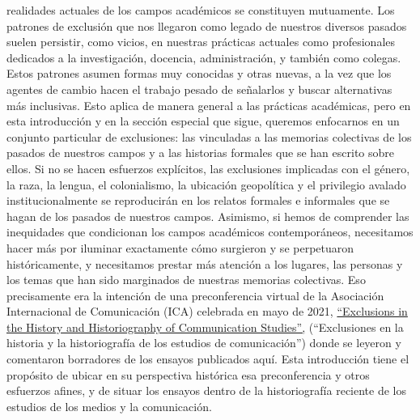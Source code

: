 \documentclass{tufte-handout}
\begin{document}
\vspace*{2em}


 realidades actuales de los campos académicos se
constituyen mutuamente. Los patrones de exclusión que nos llegaron como
legado de nuestros diversos pasados suelen persistir, como vicios, en
nuestras prácticas actuales como profesionales dedicados a la
investigación, docencia, administración, y también como colegas. Estos
patrones asumen formas muy conocidas y otras nuevas, a la vez que los
agentes de cambio hacen el trabajo pesado de señalarlos y buscar
alternativas más inclusivas. Esto aplica de manera general a las
prácticas académicas, pero en esta introducción y en la sección especial
que sigue, queremos enfocarnos en un conjunto particular de exclusiones:
las vinculadas a las memorias colectivas de los pasados de nuestros
campos y a las historias formales que se han escrito sobre ellos. Si no
se hacen esfuerzos explícitos, las exclusiones implicadas con el género,
la raza, la lengua, el colonialismo, la ubicación geopolítica y el
privilegio avalado institucionalmente se reproducirán en los relatos
formales e informales que se hagan de los pasados de nuestros campos.
Asimismo, si hemos de comprender las inequidades que condicionan los
campos académicos contemporáneos, necesitamos hacer más por iluminar
exactamente cómo surgieron y se perpetuaron históricamente, y
necesitamos prestar más atención a los lugares, las personas y los temas
que han sido marginados de nuestras memorias colectivas. Eso
precisamente era la intención de una preconferencia virtual de la
Asociación Internacional de Comunicación (ICA) celebrada en mayo de
2021,
\href{https://hms.mediastudies.press/pub/schedule/release/12}{``Exclusions
in the History and Historiography of Communication Studies'',}
(``Exclusiones en la historia y la historiografía de los estudios de
comunicación'') donde se leyeron y comentaron borradores de los ensayos
publicados aquí. Esta introducción tiene el propósito de ubicar en su
perspectiva histórica esa preconferencia y otros esfuerzos afines, y de
situar los ensayos dentro de la historiografía reciente de los estudios
de los medios y la comunicación.

\newpage
\end{document}
